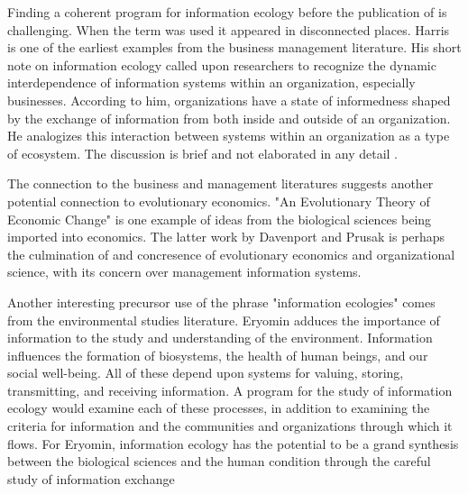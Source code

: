 Finding a coherent program for information ecology before the publication of \cite{nardi_information_1999} is challenging. When the term was used it appeared in disconnected places. Harris is one of the earliest examples from the business management literature. His short note on information ecology called upon researchers to recognize the dynamic interdependence of information systems within an organization, especially businesses. According to him, organizations have a state of informedness shaped by the exchange of information from both inside and outside of an organization. He analogizes this interaction between systems within an organization as a type of ecosystem. The discussion is brief and not elaborated in any detail \cite{harris_information_1989}.

The connection to the business and management literatures suggests another potential connection to evolutionary economics. "An Evolutionary Theory of Economic Change" \cite{nelson_evolutionary_1985} is one example of ideas from the biological sciences being imported into economics. The latter work by Davenport and Prusak is perhaps the culmination of and concresence of evolutionary economics and organizational science, with its concern over management information systems.

Another interesting precursor use of the phrase "information ecologies" comes from the environmental studies literature. Eryomin adduces the importance of information to the study and understanding of the environment. Information influences the formation of biosystems, the health of human beings, and our social well-being. All of these depend upon systems for valuing, storing, transmitting, and receiving information. A program for the study of information ecology would examine each of these processes, in addition to examining the criteria for information and the communities and organizations through which it flows. For Eryomin, information ecology has the potential to be a grand synthesis between the biological sciences and the human condition through the careful study of information exchange \cite{eryomin_information_1998}